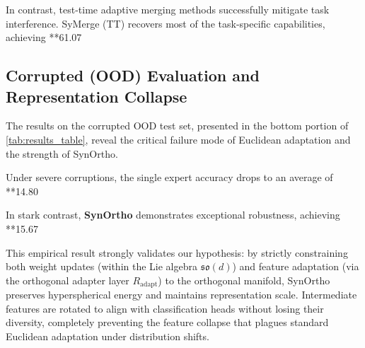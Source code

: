 \documentclass{article}
\theoremstyle{plain}
\theoremstyle{definition}
\theoremstyle{remark}
\begin{document}
In contrast, test-time adaptive merging methods successfully mitigate task interference. SyMerge (TT) recovers most of the task-specific capabilities, achieving **61.07%

\subsection{Corrupted (OOD) Evaluation and Representation Collapse}
The results on the corrupted OOD test set, presented in the bottom portion of \cref{tab:results_table}, reveal the critical failure mode of Euclidean adaptation and the strength of SynOrtho.

Under severe corruptions, the single expert accuracy drops to an average of **14.80%

In stark contrast, \textbf{SynOrtho} demonstrates exceptional robustness, achieving **15.67%

This empirical result strongly validates our hypothesis: by strictly constraining both weight updates (within the Lie algebra $\mathfrak{so}(d)$) and feature adaptation (via the orthogonal adapter layer $R_{\text{adapt}}$) to the orthogonal manifold, SynOrtho preserves hyperspherical energy and maintains representation scale. Intermediate features are rotated to align with classification heads without losing their diversity, completely preventing the feature collapse that plagues standard Euclidean adaptation under distribution shifts.
\end{document}
